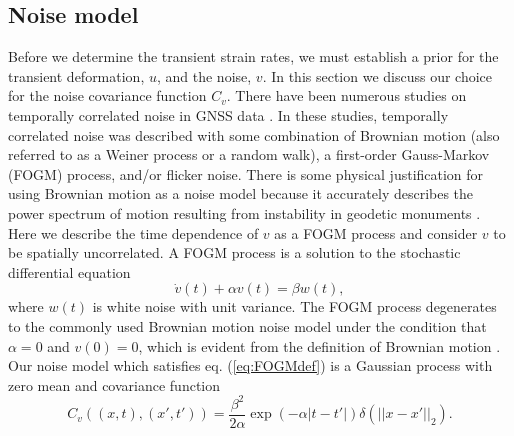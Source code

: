 \documentclass[10pt,letter]{article}
\begin{document}
\subsection{Noise model}\label{sec:NoiseModel}
Before we determine the transient strain rates, we must establish a prior for the transient deformation, $u$, and the noise, $v$. In this section we discuss our choice for the noise covariance function $C_v$. There have been numerous studies on temporally correlated noise in GNSS data \citep[e.g.,][]{Zhang1997,Mao1999,Williams2004,Langbein2008}. In these studies, temporally correlated noise was described with some combination of Brownian motion (also referred to as a Weiner process or a random walk), a first-order Gauss-Markov (FOGM) process, and/or flicker noise. There is some physical justification for using Brownian motion as a noise model because it accurately describes the power spectrum of motion resulting from instability in geodetic monuments \citep[e.g.,][]{Wyatt1982,Wyatt1989,Langbein1997}. Here we describe the time dependence of $v$ as a FOGM process and consider $v$ to be spatially uncorrelated. A FOGM process is a solution to the stochastic differential equation
\begin{equation}\label{eq:FOGMdef}
\dot{v}(t) + \alpha v(t) = \beta w(t),
\end{equation}
where $w(t)$ is white noise with unit variance. The FOGM process degenerates to the commonly used Brownian motion noise model under the condition that $\alpha=0$ and $v(0) = 0$, which is evident from the definition of Brownian motion \citep[e.g.,][]{Papoulis1991}. Our noise model which satisfies eq. (\ref{eq:FOGMdef}) is a Gaussian process with zero mean and covariance function
\begin{equation}\label{eq:FOGM}
C_v\left((x,t),(x',t')\right) = \frac{\beta^2}{2\alpha}\exp\left(-\alpha|t - t'|\right) \delta(||x - x'||_2). 
\end{equation}
\end{document}
